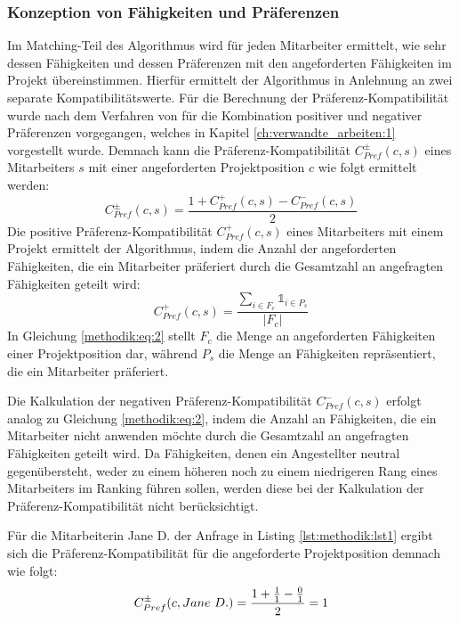 \subsubsection{Konzeption von Fähigkeiten und Präferenzen}
Im Matching-Teil des Algorithmus wird für jeden Mitarbeiter ermittelt, wie sehr dessen Fähigkeiten und dessen Präferenzen mit den angeforderten Fähigkeiten im Projekt übereinstimmen.
Hierfür ermittelt der Algorithmus in Anlehnung an \textcite[S. 207ff.]{pizzato:2010} zwei separate Kompatibilitätswerte.
Für die Berechnung der Präferenz-Kompatibilität wurde nach dem Verfahren von \textcite[S. 269ff.]{pizzato:2:inproceedings} für die Kombination positiver und negativer Präferenzen vorgegangen, welches in Kapitel \ref{ch:verwandte_arbeiten:1} vorgestellt wurde.
Demnach kann die Präferenz-Kompatibilität $C_{Pref}^{\pm}(c,s)$ eines Mitarbeiters $s$ mit einer angeforderten Projektposition $c$ wie folgt ermittelt werden:
\begin{equation}\label{methodik:eq:1}
    C_{Pref}^{\pm}(c,s)=\frac{1+C_{Pref}^{+}(c,s)-C_{Pref}^{-}(c,s)}{2}
\end{equation}
Die positive Präferenz-Kompatibilität $C_{Pref}^{+}(c,s)$ eines Mitarbeiters mit einem Projekt ermittelt der Algorithmus, indem die Anzahl der angeforderten Fähigkeiten, die ein Mitarbeiter präferiert durch die Gesamtzahl an angefragten Fähigkeiten geteilt wird:
\begin{equation}\label{methodik:eq:2}
    C_{Pref}^{+}(c,s)=\frac{\sum\limits_{i \in F_{c}} \mathbb{1}_{i \in P_{s}}}{|F_{c}|}
\end{equation}
In Gleichung \ref{methodik:eq:2} stellt $F_{c}$ die Menge an angeforderten Fähigkeiten einer Projektposition dar, während $P_{s}$ die Menge an Fähigkeiten repräsentiert, die ein Mitarbeiter präferiert.

Die Kalkulation der negativen Präferenz-Kompatibilität $C_{Pref}^{-}(c,s)$ erfolgt analog zu Gleichung \ref{methodik:eq:2}, indem die Anzahl an Fähigkeiten, die ein Mitarbeiter nicht anwenden möchte durch die Gesamtzahl an angefragten Fähigkeiten geteilt wird.
Da Fähigkeiten, denen ein Angestellter neutral gegenübersteht, weder zu einem höheren noch zu einem niedrigeren Rang eines Mitarbeiters im Ranking führen sollen, werden diese bei der Kalkulation der Präferenz-Kompatibilität nicht berücksichtigt.

Für die Mitarbeiterin Jane D. der Anfrage in Listing \ref{lst:methodik:lst1} ergibt sich die Präferenz-Kompatibilität für die angeforderte Projektposition demnach wie folgt:
\begin{equation}\label{methodik:eq:4}
    C_{Pref}^{\pm}(c,Jane \textnormal{ }D.) = \frac{1+\frac{1}{1}-\frac{0}{1}}{2} = 1
\end{equation}

